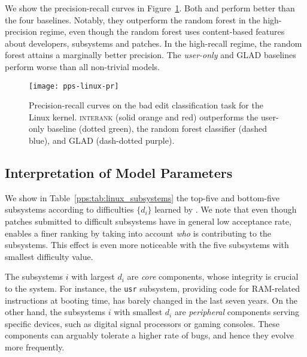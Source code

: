 We show the precision-recall curves in Figure~\ref{pps:fig:linux_results}.
Both  and  perform better than the four baselines.
Notably, they outperform the random forest in the high-precision regime, even though the random forest uses content-based features about developers, subsystems and patches.
In the high-recall regime, the random forest attains a marginally better precision.
The \emph{user-only} and GLAD baselines perform worse than all non-trivial models.

\begin{figure}
	\centering
	\texttt{[image: pps-linux-pr]}
	\caption{Precision-recall curves on the bad edit classification task for the Linux kernel. \textsc{interank} (solid orange and red) outperforms the user-only baseline (dotted green), the random forest classifier (dashed blue), and GLAD (dash-dotted purple).}
	\label{pps:fig:linux_results}
\end{figure}

\subsection{Interpretation of Model Parameters}

We show in Table~\ref{pps:tab:linux_subsystems} the top-five and bottom-five subsystems according to  difficulties $\{d_i\}$ learned by .
We note that even though patches submitted to difficult subsystems have in general low acceptance rate, \interank{} enables a finer ranking by taking into account \emph{who} is contributing to the subsystems.
This effect is even more noticeable with the five subsystems with smallest difficulty value.

The subsystems $i$ with largest $d_i$ are \emph{core} components, whose integrity is crucial to the system.
For instance, the \texttt{usr} subsystem, providing code for RAM-related instructions at booting time, has barely changed in the last seven years.
On the other hand, the subsystems $i$ with smallest $d_i$ are \textit{peripheral} components serving specific devices, such as digital signal processors or gaming consoles.
These components can arguably tolerate a higher rate of bugs, and hence they evolve more frequently.

